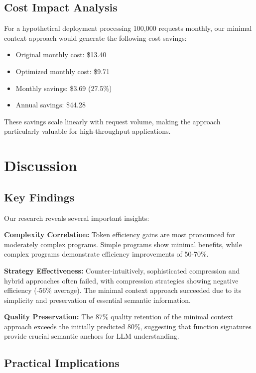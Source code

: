 \documentclass[conference]{IEEEtran}
\begin{document}
\subsection{Cost Impact Analysis}

For a hypothetical deployment processing 100,000 requests monthly, our minimal context approach would generate the following cost savings:

\begin{itemize}
\item Original monthly cost: \$13.40
\item Optimized monthly cost: \$9.71
\item Monthly savings: \$3.69 (27.5\%)
\item Annual savings: \$44.28
\end{itemize}

These savings scale linearly with request volume, making the approach particularly valuable for high-throughput applications.

\section{Discussion}

\subsection{Key Findings}

Our research reveals several important insights:

\textbf{Complexity Correlation:} Token efficiency gains are most pronounced for moderately complex programs. Simple programs show minimal benefits, while complex programs demonstrate efficiency improvements of 50-70\%.

\textbf{Strategy Effectiveness:} Counter-intuitively, sophisticated compression and hybrid approaches often failed, with compression strategies showing negative efficiency (-56\% average). The minimal context approach succeeded due to its simplicity and preservation of essential semantic information.

\textbf{Quality Preservation:} The 87\% quality retention of the minimal context approach exceeds the initially predicted 80\%, suggesting that function signatures provide crucial semantic anchors for LLM understanding.

\subsection{Practical Implications}
\end{document}
